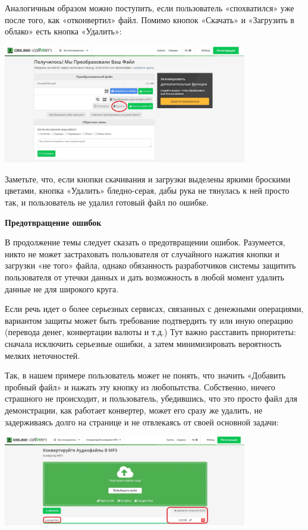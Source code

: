 Аналогичным образом можно поступить, если пользователь «спохватился» уже после того, как «отконвертил» файл. Помимо кнопок «Скачать» и «Загрузить в облако» есть кнопка «Удалить»:

\begin{center}
    \includegraphics[width=0.8\textwidth]{img/cxp6.jpg}
\end{center}

Заметьте, что, если кнопки скачивания и загрузки выделены яркими броскими цветами, кнопка «Удалить» бледно-серая, дабы рука не тянулась к ней просто так, и пользователь не удалил готовый файл по ошибке.


\textbf{Предотвращение ошибок}

В продолжение темы следует сказать о предотвращении ошибок. Разумеется, никто не может застраховать пользователя от случайного нажатия кнопки и загрузки «не того» файла, однако обязанность разработчиков системы защитить пользователя от утечки данных и дать возможность в любой момент удалить данные не для широкого круга.

Если речь идет о более серьезных сервисах, связанных с денежными операциями, вариантом защиты может быть требование подтвердить ту или иную операцию (перевода денег, конвертации валюты и т.д.) Тут важно расставить приоритеты: сначала исключить серьезные ошибки, а затем минимизировать вероятность мелких неточностей.

Так, в нашем примере пользователь может не понять, что значить «Добавить пробный файл» и нажать эту кнопку из любопытства. Собственно, ничего страшного не происходит, и пользователь, убедившись, что это просто файл для демонстрации, как работает конвертер, может его сразу же удалить, не задерживаясь долго на странице и не отвлекаясь от своей основной задачи:

\begin{center}
    \includegraphics[width=0.8\textwidth]{img/cxp7.jpg}
\end{center}

